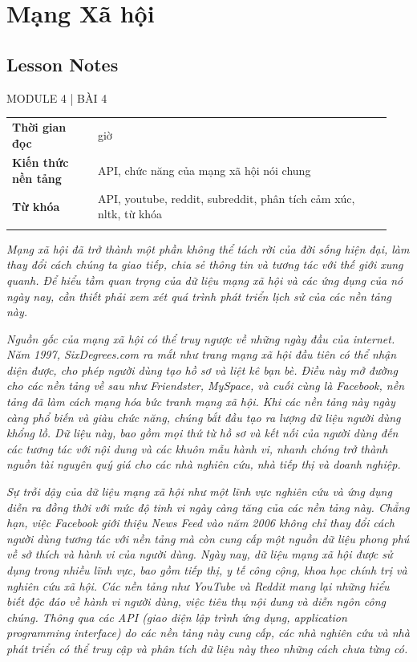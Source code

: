 \chapter{Mạng Xã hội}
\label{ch:M4L4}


\section*{Lesson Notes}

MODULE 4 | BÀI 4

{\small
\begin{longtable}{>{\raggedright\arraybackslash}p{0.213\linewidth}>{\raggedright\arraybackslash}p{0.727\linewidth}}
\toprule
\textbf{Thời gian đọc} & 6 giờ \\
\addlinespace[2pt]
\textbf{Kiến thức nền tảng} & API, chức năng của mạng xã hội nói chung \\
\addlinespace[2pt]
\textbf{Từ khóa} & API, youtube, reddit, subreddit, phân tích cảm xúc, nltk, từ khóa \\
\addlinespace[2pt]
\bottomrule
\end{longtable}
}

\emph{Mạng xã hội đã trở thành một phần không thể tách rời của đời sống hiện đại, làm thay đổi cách chúng ta giao tiếp, chia sẻ thông tin và tương tác với thế giới xung quanh. Để hiểu tầm quan trọng của dữ liệu mạng xã hội và các ứng dụng của nó ngày nay, cần thiết phải xem xét quá trình phát triển lịch sử của các nền tảng này.}

\emph{Nguồn gốc của mạng xã hội có thể truy ngược về những ngày đầu của internet. Năm 1997, SixDegrees.com ra mắt như trang mạng xã hội đầu tiên có thể nhận diện được, cho phép người dùng tạo hồ sơ và liệt kê bạn bè. Điều này mở đường cho các nền tảng về sau như Friendster, MySpace, và cuối cùng là Facebook, nền tảng đã làm cách mạng hóa bức tranh mạng xã hội. Khi các nền tảng này ngày càng phổ biến và giàu chức năng, chúng bắt đầu tạo ra lượng dữ liệu người dùng khổng lồ. Dữ liệu này, bao gồm mọi thứ từ hồ sơ và kết nối của người dùng đến các tương tác với nội dung và các khuôn mẫu hành vi, nhanh chóng trở thành nguồn tài nguyên quý giá cho các nhà nghiên cứu, nhà tiếp thị và doanh nghiệp.}

\emph{Sự trỗi dậy của dữ liệu mạng xã hội như một lĩnh vực nghiên cứu và ứng dụng diễn ra đồng thời với mức độ tinh vi ngày càng tăng của các nền tảng này. Chẳng hạn, việc Facebook giới thiệu News Feed vào năm 2006 không chỉ thay đổi cách người dùng tương tác với nền tảng mà còn cung cấp một nguồn dữ liệu phong phú về sở thích và hành vi của người dùng. Ngày nay, dữ liệu mạng xã hội được sử dụng trong nhiều lĩnh vực, bao gồm tiếp thị, y tế công cộng, khoa học chính trị và nghiên cứu xã hội. Các nền tảng như YouTube và Reddit mang lại những hiểu biết độc đáo về hành vi người dùng, việc tiêu thụ nội dung và diễn ngôn công chúng. Thông qua các API (giao diện lập trình ứng dụng, application programming interface) do các nền tảng này cung cấp, các nhà nghiên cứu và nhà phát triển có thể truy cập và phân tích dữ liệu này theo những cách chưa từng có.}

